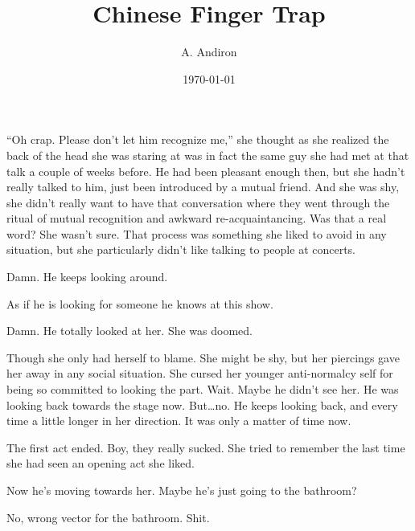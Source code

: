 \documentclass[letterpaper]{article}
\title{Chinese Finger Trap}
\author{A. Andiron}
\date{\today}
\begin{document}
\maketitle

``Oh crap. Please don't let him recognize me,'' she thought as she realized the back of the head she was staring at was in fact the same guy she had met at that talk a couple of weeks before.
He had been pleasant enough then, but she hadn't really talked to him, just been introduced by a mutual friend.
And she was shy, she didn't really want to have that conversation where they went through the ritual of mutual recognition and awkward re-acquaintancing. Was that a real word?
She wasn't sure. That process was something she liked to avoid in any situation, but she particularly didn't like talking to people at concerts.

Damn. He keeps looking around. 

As if he is looking for someone he knows at this show.

Damn. He totally looked at her. She was doomed.

Though she only had herself to blame.
She might be shy, but her piercings gave her away in any social situation.
She cursed her younger anti-normalcy self for being so committed to looking the part.
Wait. Maybe he didn't see her. He was looking back towards the stage now.
But\ldots no. He keeps looking back, and every time a little longer in her direction. It was only a matter of time now.

The first act ended. Boy, they really sucked. She tried to remember the last time she had seen an opening act she liked.

Now he's moving towards her.
Maybe he's just going to the bathroom?

No, wrong vector for the bathroom. Shit.
\end{document}
